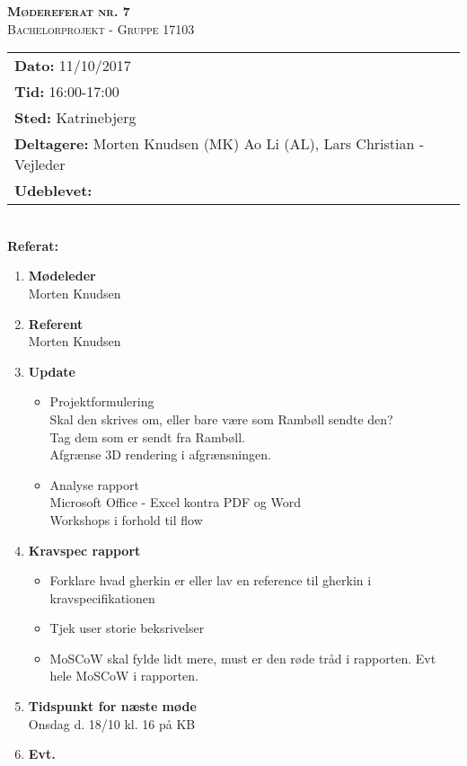 
\newcommand{\HRule}{\rule{\linewidth}{0.1mm}}


	\begin{center}
		{\huge \bfseries \textsc{Mødereferat nr. 7}}\\
		\textsc{\large Bachelorprojekt - Gruppe 17103}\\[0.3cm]
	\end{center}
	\begin{tabular}{ll}
	\large \textbf{Dato:} 11/10/2017  	\\ %
	\large \textbf{Tid:}  16:00-17:00 	\\ %
	\large \textbf{Sted:} Katrinebjerg		\\ %
	\large \textbf{Deltagere:} Morten Knudsen (MK) Ao Li (AL), Lars Christian - Vejleder \\
	\large \textbf{Udeblevet:} 
	\end{tabular}\\
	\phantom{\,}\hspace{0.1em} \large \textbf{Referat:}
	\begin{enumerate}
		\itemsep 0.3em 
		\item \textbf{Mødeleder}\\
			Morten Knudsen
		\item \textbf{Referent}\\
			Morten Knudsen

		\item \textbf{Update}
			\begin{itemize}[-]
				\item Projektformulering \\
				Skal den skrives om, eller bare være som Rambøll sendte den? \\
				Tag dem som er sendt fra Rambøll. \\
				Afgrænse 3D rendering i afgrænsningen. \\
				
				\item Analyse rapport \\
				Microsoft Office - Excel kontra PDF og Word \\
				Workshops i forhold til flow
			\end{itemize}
	
		\item \textbf{Kravspec rapport}
		\begin{itemize}[-]
			\item Forklare hvad gherkin er eller lav en reference til gherkin i kravspecifikationen
			\item Tjek user storie beksrivelser
			\item MoSCoW skal fylde lidt mere, must er den røde tråd i rapporten. Evt hele MoSCoW i rapporten.
		\end{itemize}
	
		\item \textbf{Tidspunkt for næste møde} \\
			Onsdag d. 18/10 kl. 16 på KB
			
		\item \textbf{Evt.}
			
	\end{enumerate}
